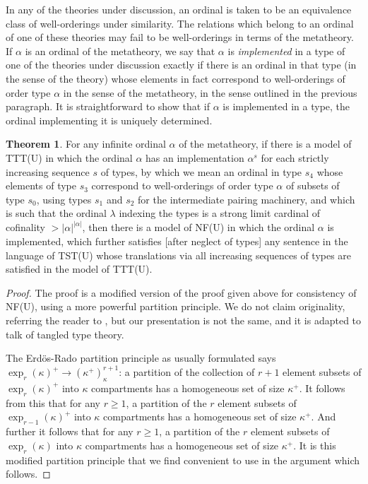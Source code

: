 \documentclass{article}
\newif\ifshowannotations
\newcommand{\abf}{\ifshowannotations\bf\fi}
\theoremstyle{definition}
\newtheorem{theorem}{Theorem}[section]
\theoremstyle{remark}
\begin{document}
{In any of the theories under discussion, an ordinal is taken to be an equivalence class of well-orderings under similarity.
The relations which belong to an ordinal of one of these theories may fail to be well-orderings in terms of the metatheory.
If $\alpha$ is an ordinal of the metatheory, we say that $\alpha$ is {\em implemented\/} in a type of one of the theories under discussion
exactly if there is an ordinal in that type (in the sense of the theory) whose elements in fact correspond to well-orderings of order type $\alpha$ in the sense of the metatheory, in the sense outlined in the previous paragraph.  It is straightforward to show that if $\alpha$ is implemented in a type, the ordinal implementing it {\abf is uniquely determined}.

\begin{theorem}

For any infinite ordinal $\alpha$ of the metatheory, if there is a model of TTT(U) in which the ordinal $\alpha$ has an implementation $\alpha^s$ for each strictly increasing sequence $s$ of types, by which we mean an ordinal in type $s_4$ whose elements of type $s_3$ correspond to well-orderings of order type $\alpha$ of subsets of type $s_0$, using types $s_1$ and $s_2$ for the intermediate pairing machinery, and which is such that the ordinal $\lambda$ indexing the types is a strong limit cardinal of cofinality $>|\alpha|^{|\alpha|}$, then there is a model of NF(U) in which the ordinal $\alpha$ is implemented, which further satisfies [after neglect of types] any sentence in the language of TST(U) whose translations via all increasing sequences of types are satisfied in the model of TTT(U).

\end{theorem}

\begin{proof}

The proof is a modified version of the proof given above for consistency of NF(U), using a more powerful partition principle.  We do not claim originality, referring the reader to \cite{nfu}, but our presentation is not the same, and it is adapted to talk of tangled type theory.

{\abf The Erd\"os-Rado partition principle as usually formulated says $\exp_r(\kappa)^+ \rightarrow (\kappa^+)_\kappa^{r+1}$:  a partition of the collection of $r+1$ element subsets of $\exp_r(\kappa)^+$ into $\kappa$ compartments has a homogeneous set of size $\kappa^+$.   It follows from this that for any $r \geq 1$, a partition of the $r$ element subsets of $\exp_{r-1}(\kappa)^+$ into $\kappa$ compartments has a homogeneous set of size $\kappa^+$.  And further it follows that for any $r \geq 1$, a partition of the $r$ element subsets of $\exp_{r}(\kappa)$ into $\kappa$ compartments has a homogeneous set of size $\kappa^+$.  It is this modified partition principle that we find convenient to use in the argument which follows.}


\end{proof}}
\end{document}
